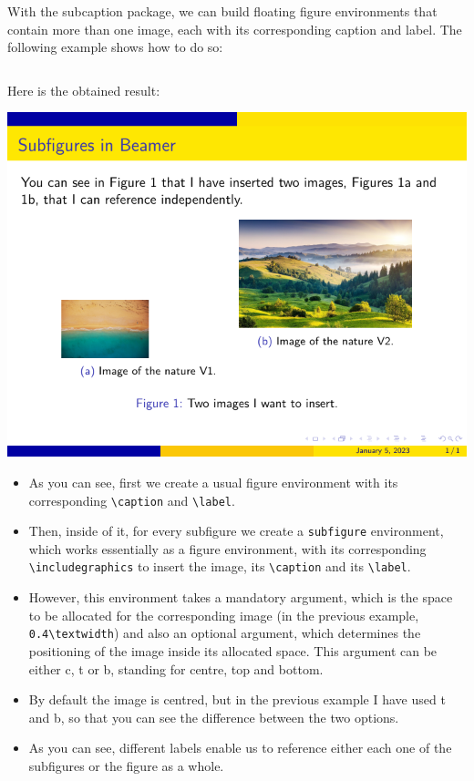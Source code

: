 \begin{column}{0.5\textwidth}
With the subcaption package, we can build floating figure environments that contain more than one image, each with its corresponding caption and label. The following example shows how to do so:

\inputminted[linenos=true]{latex}{examples/beamer/beamerfigure12.tex}

Here is the obtained result:

\includegraphics{examples/beamer/beamerfigure12.pdf}

\begin{itemize}
  \item As you can see, first we create a usual figure environment with its corresponding \verb|\caption| and \verb|\label|.
  \item Then, inside of it, for every subfigure we create a \verb|subfigure| environment, which works essentially as a figure environment, with its corresponding \verb|\includegraphics| to insert the image, its \verb|\caption| and its \verb|\label|.
  \item However, this environment takes a mandatory argument, which is the space to be allocated for the corresponding image (in the previous example, \verb|0.4\textwidth|) and also an optional argument, which determines the positioning of the image inside its allocated space. This argument can be either c, t or b, standing for centre, top and bottom.
  \item By default the image is centred, but in the previous example I have used t and b, so that you can see the difference between the two options.
  \item As you can see, different labels enable us to reference either each one of the subfigures or the figure as a whole.
\end{itemize}


\end{column}

